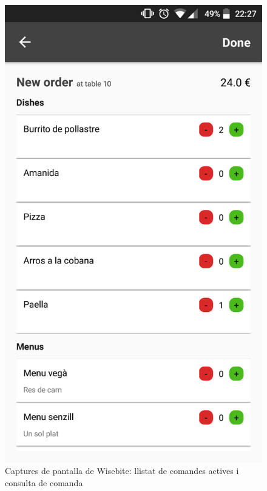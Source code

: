 \begin{figure}[!h]
\includegraphics[scale=0.15]{Figures/wisebite_screenshot_4.png}
\caption{Captures de pantalla de Wisebite: llistat de comandes actives i consulta de comanda}
\end{figure}

